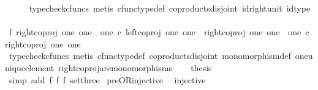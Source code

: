 \begin{isabellebody}
\ \ \ \ \isamarkupfalse%
\ {\isacharparenleft}{\kern0pt}typecheck{\isacharunderscore}{\kern0pt}cfuncs{\isacharcomma}{\kern0pt}\ metis\ cfunc{\isacharunderscore}{\kern0pt}type{\isacharunderscore}{\kern0pt}def\ coproducts{\isacharunderscore}{\kern0pt}disjoint\ id{\isacharunderscore}{\kern0pt}right{\isacharunderscore}{\kern0pt}unit\ id{\isacharunderscore}{\kern0pt}type{\isacharparenright}{\kern0pt}\isanewline
\ \ \isamarkupfalse%
\ f{}{\isacharcolon}{\kern0pt}\ {\isachardoublequoteopen}right{\isacharunderscore}{\kern0pt}coproj\ one\ {\isacharparenleft}{\kern0pt}one\ {\isasymCoprod}\ one{\isacharparenright}{\kern0pt}\ {\isasymcirc}\isactrlsub c\ left{\isacharunderscore}{\kern0pt}coproj\ one\ one\ {\isasymnoteq}\ right{\isacharunderscore}{\kern0pt}coproj\ one\ {\isacharparenleft}{\kern0pt}one\ {\isasymCoprod}\ one{\isacharparenright}{\kern0pt}\ {\isasymcirc}\isactrlsub c\ right{\isacharunderscore}{\kern0pt}coproj\ one\ one{\isachardoublequoteclose}\isanewline
\ \ \ \ \isamarkupfalse%
\ {\isacharparenleft}{\kern0pt}typecheck{\isacharunderscore}{\kern0pt}cfuncs{\isacharcomma}{\kern0pt}\ metis\ cfunc{\isacharunderscore}{\kern0pt}type{\isacharunderscore}{\kern0pt}def\ coproducts{\isacharunderscore}{\kern0pt}disjoint\ monomorphism{\isacharunderscore}{\kern0pt}def\ one{\isacharunderscore}{\kern0pt}unique{\isacharunderscore}{\kern0pt}element\ right{\isacharunderscore}{\kern0pt}coproj{\isacharunderscore}{\kern0pt}are{\isacharunderscore}{\kern0pt}monomorphisms{\isacharparenright}{\kern0pt}\isanewline
\ \ \isamarkupfalse%
\ {\isacharquery}{\kern0pt}thesis\isanewline
\ \ \ \ \isamarkupfalse%
\ {\isacharparenleft}{\kern0pt}simp\ add{\isacharcolon}{\kern0pt}\ f{}\ f{}\ f{}\ set{\isacharunderscore}{\kern0pt}three{\isacharparenright}{\kern0pt}\isanewline
{}\isamarkupfalse%
%
\endisatagproof
{\isafoldproof}%
%
\isadelimproof
\isanewline
%
\endisadelimproof
\isanewline
{}\isamarkupfalse%
\ pre{\isacharunderscore}{\kern0pt}OR{\isacharunderscore}{\kern0pt}injective{\isacharcolon}{\kern0pt}\isanewline
\ \ {\isachardoublequoteopen}injective{\isacharparenleft}{\kern0pt}{\isasymlangle}{\isasymt}{\isacharcomma}{\kern0pt}\ {\isasymt}{\isasymrangle}{\isasymamalg}\ {\isacharparenleft}{\kern0pt}{\isasymlangle}{\isasymt}{\isacharcomma}{\kern0pt}\ {\isasymf}{\isasymrangle}\ {\isasymamalg}{\isasymlangle}{\isasymf}{\isacharcomma}{\kern0pt}\ {\isasymt}{\isasymrangle}{\isacharparenright}{\kern0pt}{\isacharparenright}{\kern0pt}{\isachardoublequoteclose}\isanewline

\end{isabellebody}
